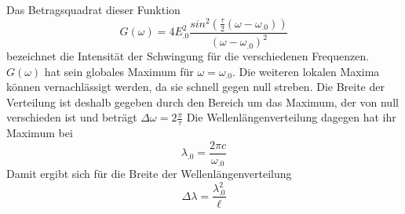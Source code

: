 Das Betragsquadrat dieser Funktion
\begin{equation*}
G(\omega)=4E^2_.0\frac{sin^2(\frac{\tau}{2}(\omega-\omega_.0))}{(\omega-\omega_.0)^2}
\end{equation*}
bezeichnet die Intensität der Schwingung für die verschiedenen Frequenzen.
$G(\omega)$ hat sein globales Maximum für $\omega =\omega_.0$. Die weiteren lokalen Maxima können vernachlässigt werden, da sie schnell gegen null streben.
Die Breite der Verteilung ist deshalb gegeben durch den Bereich um das Maximum, der von null verschieden ist und beträgt
$\Delta\omega=2\frac{\pi}{\tau}$
Die Wellenlängenverteilung dagegen hat ihr Maximum bei 
\[
\lambda_.0=\frac{2\pi c}{\omega_.0}
\]
Damit ergibt sich für die Breite der Wellenlängenverteilung
\begin{equation}
\Delta\lambda=\frac{\lambda^2_.0}{\ell}\label{eq:dl}
\end{equation}
